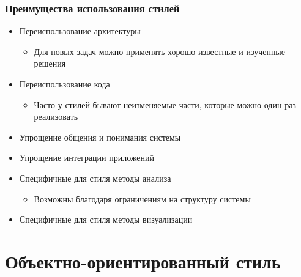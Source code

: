 \documentclass{../../slides-style}
\begin{document}
    \begin{frame}
        \frametitle{Преимущества использования стилей}
        \begin{itemize}
            \item Переиспользование архитектуры
            \begin{itemize}
                \item Для новых задач можно применять хорошо известные и изученные решения
            \end{itemize}
            \item Переиспользование кода
            \begin{itemize}
                \item Часто у стилей бывают неизменяемые части, которые можно один раз реализовать
            \end{itemize}
            \item Упрощение общения и понимания системы
            \item Упрощение интеграции приложений
            \item Специфичные для стиля методы анализа
            \begin{itemize}
                \item Возможны благодаря ограничениям на структуру системы
            \end{itemize}
            \item Специфичные для стиля методы визуализации
        \end{itemize}
    \end{frame}

    \section{Объектно-ориентированный стиль}
\end{document}
